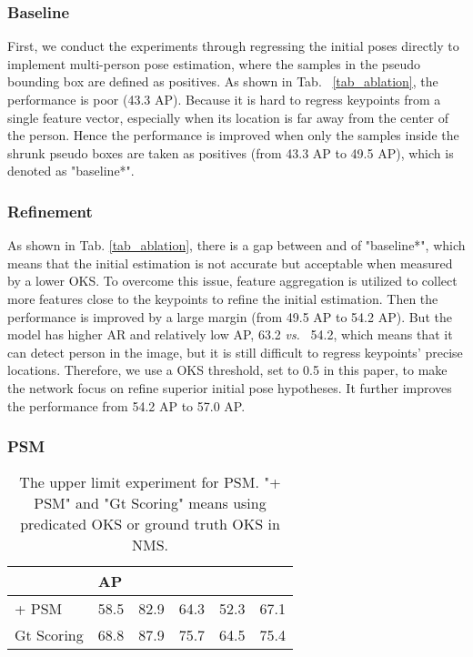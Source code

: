\documentclass[11pt,twocolumn,journal]{IEEEtran}
\newcommand{\vs}{\emph{vs.} }
\newcommand{\tab}{Tab. }
\begin{document}
\subsubsection{Baseline}
First, we conduct the experiments through regressing the initial poses directly to implement multi-person pose estimation, where the samples in the pseudo bounding box are defined as positives. As shown in \tab~\ref{tab_ablation}, the performance is poor (43.3 AP). Because it is hard to regress  keypoints from a single feature vector, especially when its location is far away from the center of the person. Hence the performance is improved when only the samples inside the shrunk pseudo boxes are taken as positives (from 43.3 AP to 49.5 AP), which is denoted as "baseline*". 

\subsubsection{Refinement}
As shown in \tab\ref{tab_ablation}, there is a gap between  and  of "baseline*", which means that the initial estimation is not accurate but acceptable when measured by a lower OKS. To overcome this issue, feature aggregation is utilized to collect more features close to the keypoints to refine the initial estimation. Then the performance is improved by a large margin (from 49.5 AP to 54.2 AP). But the model has higher AR and relatively low AP, 63.2 \vs~54.2, which means that it can detect person in the image, but it is still difficult to regress keypoints' precise locations. Therefore, we use a OKS threshold, set to 0.5 in this paper, to make the network focus on refine superior initial pose hypotheses. It further improves the performance from 54.2 AP to 57.0 AP.

\subsubsection{PSM}
\begin{table}[t]
\centering
\begin{tabular}{llllll}
\toprule
 & AP &  &  &  &  \\
\midrule
+ PSM      & 58.5 & 82.9 & 64.3 & 52.3 & 67.1 \\
Gt Scoring & 68.8 & 87.9 & 75.7 & 64.5 & 75.4 \\
\bottomrule
\end{tabular}
\caption{The upper limit experiment for PSM. "+ PSM" and "Gt Scoring" means using predicated OKS or ground truth OKS in NMS.}
\label{tab_PSM}
\end{table}
\end{document}
